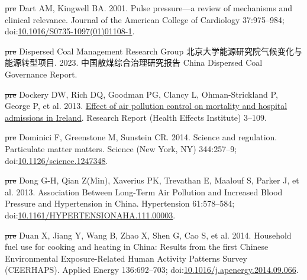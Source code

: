 \documentclass[
  letterpaper,
  DIV=11,
  numbers=noendperiod]{scrartcl}
\newlength{\cslhangindent}
\newenvironment{CSLReferences}[2] %
 {\begin{list}{}{%
  \setlength{\itemindent}{0pt} %
  \setlength{\leftmargin}{0pt} %
  \setlength{\parsep}{0pt} %
  \ifodd #1
   \setlength{\leftmargin}{\cslhangindent} %
   \setlength{\itemindent}{-1\cslhangindent} %
  \fi
  \setlength{\itemsep}{#2\baselineskip}}} %
 {\end{list}} %
\providecommand{\DIFdeltex}[1]{{\protect\color{red}\sout{#1}}}                      %
\providecommand{\DIFaddbegin}{} %
\providecommand{\DIFaddend}{} %
\providecommand{\DIFdelbegin}{} %
\providecommand{\DIFdelend}{} %
\providecommand{\DIFdel}[1]{\texorpdfstring{\DIFdeltex{#1}}{}} %
\newcommand{\DIFscaledelfig}{0.5}
\newlength{\DIFdelgraphicswidth} %
\newlength{\DIFdelgraphicsheight} %
\newcommand{\DIFaddincludegraphics}[2][]{{\color{blue}\fbox{\DIFOincludegraphics[#1]{#2}}}} %
\newcommand{\DIFdelincludegraphics}[2][]{%
\sbox{\DIFdelgraphicsbox}{\DIFOincludegraphics[#1]{#2}}%
\settoboxwidth{\DIFdelgraphicswidth}{\DIFdelgraphicsbox} %
\settoboxtotalheight{\DIFdelgraphicsheight}{\DIFdelgraphicsbox} %
\scalebox{\DIFscaledelfig}{%
\parbox[b]{\DIFdelgraphicswidth}{\usebox{\DIFdelgraphicsbox}\\[-\baselineskip] \rule{\DIFdelgraphicswidth}{0em}}\llap{\resizebox{\DIFdelgraphicswidth}{\DIFdelgraphicsheight}{%
\setlength{\unitlength}{\DIFdelgraphicswidth}%
\begin{picture}(1,1)%
\thicklines\linethickness{2pt} %
{\color[rgb]{1,0,0}\put(0,0){\framebox(1,1){}}}%
{\color[rgb]{1,0,0}\put(0,0){\line( 1,1){1}}}%
{\color[rgb]{1,0,0}\put(0,1){\line(1,-1){1}}}%
\end{picture}%
}\hspace*{3pt}}} %
} %
\DeclareRobustCommand{\DIFaddbegin}{\DIFOaddbegin \let\includegraphics\DIFaddincludegraphics} %
\DeclareRobustCommand{\DIFaddend}{\DIFOaddend \let\includegraphics\DIFOincludegraphics} %
\DeclareRobustCommand{\DIFdelbegin}{\DIFOdelbegin \let\includegraphics\DIFdelincludegraphics} %
\DeclareRobustCommand{\DIFdelend}{\DIFOaddend \let\includegraphics\DIFOincludegraphics} %
\begin{document}
\begin{CSLReferences}{1}{1}
\DIFdelbegin %
\DIFdel{pre}%
\DIFdelend \DIFaddbegin {}
\DIFaddend Dart AM, Kingwell BA. 2001. Pulse pressure---a review of mechanisms and
clinical relevance. Journal of the American College of Cardiology
37:975--984;
doi:\href{https://doi.org/10.1016/S0735-1097(01)01108-1}{10.1016/S0735-1097(01)01108-1}.

\DIFdelbegin %
\DIFdel{pre}%
\DIFdelend \DIFaddbegin {}
\DIFaddend Dispersed Coal Management Research Group
北京大学能源研究院气候变化与能源转型项目. 2023. 中国散煤综合治理研究报告
{China Dispersed Coal Governance Report}.

\DIFdelbegin %
\DIFdel{pre}%
\DIFdelend \DIFaddbegin {}
\DIFaddend Dockery DW, Rich DQ, Goodman PG, Clancy L, Ohman-Strickland P, George P,
et al. 2013. \href{https://www.ncbi.nlm.nih.gov/pubmed/24024358}{Effect
of air pollution control on mortality and hospital admissions in
{Ireland}}. Research Report (Health Effects Institute) 3--109.

\DIFdelbegin %
\DIFdel{pre}%
\DIFdelend \DIFaddbegin {}
\DIFaddend Dominici F, Greenstone M, Sunstein CR. 2014. Science and regulation.
{Particulate} matter matters. Science (New York, NY) 344:257--9;
doi:\href{https://doi.org/10.1126/science.1247348}{10.1126/science.1247348}.

\DIFdelbegin %
\DIFdel{pre}%
\DIFdelend \DIFaddbegin {}
\DIFaddend Dong G-H, Qian Z(Min), Xaverius PK, Trevathan E, Maalouf S, Parker J, et
al. 2013. Association {Between Long-Term Air Pollution} and {Increased
Blood Pressure} and {Hypertension} in {China}. Hypertension 61:578--584;
doi:\href{https://doi.org/10.1161/HYPERTENSIONAHA.111.00003}{10.1161/HYPERTENSIONAHA.111.00003}.

\DIFdelbegin %
\DIFdel{pre}%
\DIFdelend \DIFaddbegin {}
\DIFaddend Duan X, Jiang Y, Wang B, Zhao X, Shen G, Cao S, et al. 2014. Household
fuel use for cooking and heating in {China}: {Results} from the first
{Chinese Environmental Exposure-Related Human Activity Patterns Survey}
({CEERHAPS}). Applied Energy 136:692--703;
doi:\href{https://doi.org/10.1016/j.apenergy.2014.09.066}{10.1016/j.apenergy.2014.09.066}.


\end{CSLReferences}
\end{document}

